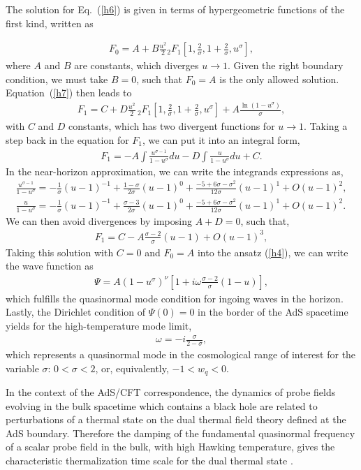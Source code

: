\documentclass[preprint]{revtex4-1}
\def\be{\begin{eqnarray}}
\def\ee{\end{eqnarray}}
\begin{document}
The solution for Eq.~(\ref{h6}) is given in terms of hypergeometric functions of the first kind, written as

\be
\label{h8}
F_0 = A + B \frac{u^2}{2} {_2}F{_1} \left[1, \frac{2}{\sigma}, 1 +\frac{2}{\sigma}, u^\sigma \right],
\ee
where $A$ and $B$ are constants, which diverges $u \rightarrow 1$. Given the right boundary condition, we must take $B=0$, such that $F_0=A$ is the only allowed solution. Equation~(\ref{h7}) then leads to 
\be
\label{h9}
F_1 = C + D \frac{u^2}{2}\, {_2}F{_1} \left[1, \frac{2}{\sigma}, 1 +\frac{2}{\sigma}, u^\sigma \right]+ A \frac{\ln (1-u^\sigma)}{\sigma},
\ee
with $C$ and $D$ constants, which has two divergent functions for $u \rightarrow 1$. Taking a step back in the equation for $F_1$, we can put it into an integral form, 
\be
\label{h10}
F_1 = -A \int \frac{u^{\sigma -1}}{1-u^\sigma} du - D \int \frac{u}{1-u^\sigma}du + C.
\ee
In the near-horizon approximation, we can write the integrands expressions as,
\be
\label{h11}
\frac{u^{\sigma -1}}{1-u^\sigma} = -\frac{1}{\sigma}(u-1)^{-1} + \frac{1-\sigma}{2\sigma}(u-1)^0 + \frac{-5+6\sigma - \sigma^2}{12\sigma}(u-1)^1 + O(u-1)^2, \\
\label{h12}
\frac{u}{1-u^\sigma} = -\frac{1}{\sigma}(u-1)^{-1} + \frac{\sigma-3}{2\sigma}(u-1)^0 + \frac{-5+6\sigma - \sigma^2}{12\sigma}(u-1)^1 + O(u-1)^2.
\ee
We can then avoid divergences by imposing $A+D=0$, such that,
\be
\label{h13}
F_1 = C - A \frac{\sigma - 2}{\sigma}(u-1) + O(u-1)^3,
\ee
Taking this solution with $C=0$ and $F_0=A$ into the ansatz (\ref{h4}), we can write the wave function as 
\be
\label{h14}
\Psi = A(1-u^\sigma)^\nu \left[1+ i\omega \frac{\sigma -2}{\sigma}(1-u) \right],
\ee
which fulfills the quasinormal mode condition for ingoing waves in the horizon. Lastly, the Dirichlet condition of $\Psi (0) = 0$ in the border of the AdS spacetime yields for the high-temperature mode limit,
\be
\label{h15}
\omega=-i\frac{\sigma}{2-\sigma},
\ee
which represents a quasinormal mode in the cosmological range of interest for the variable $\sigma$: $0<\sigma < 2$, or, equivalently, $-1 < w_q < 0$. 

In the context of the AdS/CFT correspondence,  the dynamics of probe fields evolving in the bulk spacetime which contains a black hole are related to perturbations of a thermal state on the dual thermal field theory defined at the AdS boundary. Therefore the damping of the fundamental quasinormal frequency  of a scalar probe field in the bulk, with high  Hawking temperature, gives the characteristic thermalization time scale for the dual thermal state \cite{Horowitz:1999jd}. 
\end{document}
